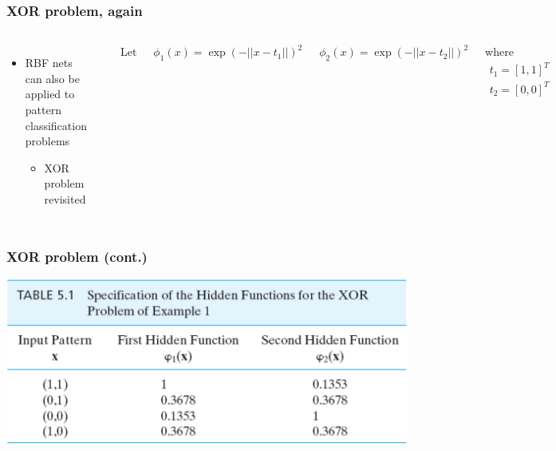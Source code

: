 \documentclass[12pt,notes,mathserif]{beamer}
\begin{document}
\begin{frame}[t]
	\frametitle{XOR problem, again}
	\begin{columns}

		\begin{itemize}
			\item RBF nets can also be applied to pattern classification problems
			      \begin{itemize}
				      \item XOR problem revisited
			      \end{itemize}
		\end{itemize}
		\begin{center}
			\includegraphics[width=0.3\linewidth]{fig/lec736.jpg}
		\end{center}
		Let

		$\phi_1(x)=\exp (-||x-t_1||)^2$

		$\phi_2(x)=\exp (-||x-t_2||)^2$

		where
		\[\begin{array}{c}
				t_1=[1,1]^T \\
				t_2=[0,0]^T
			\end{array}\]
	\end{columns}
\end{frame}


\begin{frame}[c]
	\frametitle{XOR problem (cont.)}
	\begin{center}
		\includegraphics[width=0.95\linewidth]{fig/lec737.jpg}
	\end{center}
\end{frame}
\end{document}
